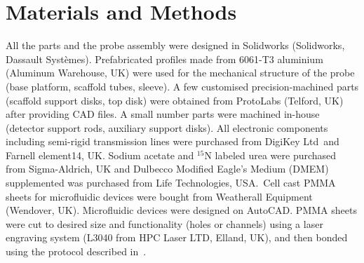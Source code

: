 \documentclass[preprint,5p]{elsarticle}
\begin{document}
\section{Materials and Methods}
All the parts and the probe assembly were designed in Solidworks (Solidworks,
Dassault Syst\`{e}mes). Prefabricated profiles made from 6061-T3 aluminium
(Aluminum Warehouse, UK) were used for the mechanical structure of the probe
(base platform, scaffold tubes, sleeve). A few customised precision-machined
parts (scaffold support disks, top disk) were obtained from ProtoLabs (Telford,
UK) after providing CAD files. A small number parts were machined in-house
(detector support rods, auxiliary support disks). All electronic components
including semi-rigid transmission lines were purchased from DigiKey Ltd\cbstart\ and Farnell element14, UK. Sodium acetate and $^{15}$N labeled urea were purchased from Sigma-Aldrich, UK and Dulbecco Modified Eagle's Medium (DMEM) supplemented was purchased from Life Technologies, USA.\cbend\ Cell cast PMMA sheets for microfluidic devices were bought from Weatherall Equipment
(Wendover, UK). Microfluidic devices were designed on AutoCAD. PMMA sheets were
cut to desired size and functionality (holes or channels) using a laser
engraving system  (L3040 from HPC Laser LTD, Elland, UK), and then bonded using the protocol
described in~\cite{yilmaz_bonding}.
\end{document}
